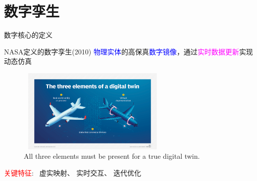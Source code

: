 \section{数字孪生}
\begin{frame}{数字核心的定义}
	\begin{block}{\textrm{NASA}定义的数字孪生\textrm{(2010)}}
		\textcolor{blue}{物理实体}的高保真\textcolor{blue}{数字镜像}，通过\textcolor{magenta}{实时数据更新}实现动态仿真
  \end{block}
%

\begin{figure}[h!]
\centering
     \includegraphics[height=1.6in, width=2.9in, viewport=30 30 1100 680,clip]{Figures/Three-elements_of_a_digital-twin.png}
\caption{\tiny \textrm{All three elements must be present for a true digital twin.}}%
\label{Fig:Three-elements_of_a_digital-twin}
\end{figure}
\textcolor{red}{关键特征}:~
虚实映射、
实时交互、
迭代优化
\end{frame}


